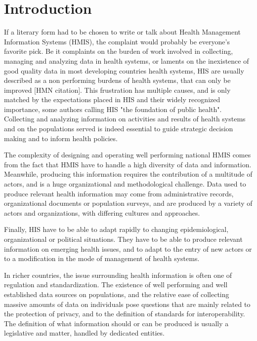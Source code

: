 \section{Introduction}

If a literary form had to be chosen to write or talk about Health Management Information Systems (HMIS), the complaint would probably be everyone's favorite pick. Be it complaints on the burden of work involved in collecting, managing and analyzing data in health systems, or laments on the inexistence of good quality data in most developing countries health systems, HIS are usually described as a non performing burdens of health systems, that can only be improved [HMN citation]. This frustration has multiple causes, and is only matched by the expectations placed in HIS and their widely recognized importance, some authors calling HIS "the foundation of public health"\cite{foundph}. Collecting and analyzing information on activities and results of health systems and on the populations served is indeed essential to guide strategic decision making and to inform health policies.

The complexity of designing and operating well performing national HMIS comes from the fact that HMIS have to handle a high diversity of data and information. Meanwhile, producing this information requires the contribution of a multitude of actors, and is a huge organizational and methodological challenge. Data used to produce relevant health information may come from administrative records, organizational documents or population surveys, and are produced by a variety of actors and organizations, with differing cultures and approaches.

Finally, HIS have to be able to adapt rapidly to changing epidemiological, organizational or political situations. They have to be able to produce relevant information on emerging health issues, and to adapt to the entry of new actors or to a modification in the mode of management of health systems.

In richer countries, the issue surrounding health information is often one of regulation and standardization. The  existence of well performing and well established data sources on populations, and the relative ease of collecting massive amounts of data on individuals pose questions that are mainly related to the protection of privacy, and to the definition of standards for interoperability. The definition of what information should or can be produced is usually a legislative and matter, handled by dedicated entities.

